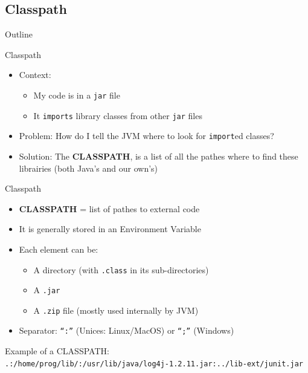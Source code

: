 \documentclass[English,c,%
hyperref={%
    pdftitle={FISA-DE2 OOP in Java},%
    pdfauthor={Muller, Gravier, Laforest, Subercaze},%
    pdfsubject={OOP in Java},%
    pdfkeywords={OOP, Java},%
    colorlinks=true,%
    urlcolor=blue,%
    linkcolor=%
    },%
xcolor={pdftex,svgnames} %
]{beamer}
\begin{document}
\subsection{Classpath}
   \begin{frame}{Outline}
       \tableofcontents[currentsubsection]
   \end{frame}

\begin{frame}{Classpath}
  \begin{itemize}
    \item Context:
    \begin{itemize}
      \item My code is in a \texttt{jar} file
      \item It \texttt{imports} library classes from other \texttt{jar} files
    \end{itemize}
    \medskip
    \item Problem: How do I tell the JVM where to look for \texttt{import}ed classes?
    \pause
    \bigskip
    \item Solution: The \textbf{CLASSPATH}, is a list of all the pathes where to find these librairies (both Java's and our own's)
  \end{itemize}
\end{frame}


\begin{frame}{Classpath}
  \begin{itemize}
    \item \textbf{CLASSPATH} = list of pathes to external code
\medskip
    \item It is generally stored in an Environment Variable
    \item Each element can be:
    \begin{itemize}
      \item A directory (with \texttt{.class} in its sub-directories)
      \item A \texttt{.jar}
      \item A \texttt{.zip} file (mostly used internally by JVM)
    \end{itemize}
    \item Separator: \texttt{``:''} (Unices: Linux/MacOS) or \texttt{``;''} (Windows)
\end{itemize}
\bigskip
Example of a CLASSPATH:\\
{\footnotesize \texttt{.:/home/prog/lib/:/usr/lib/java/log4j-1.2.11.jar:../lib-ext/junit.jar}}
\end{frame}
\end{document}
